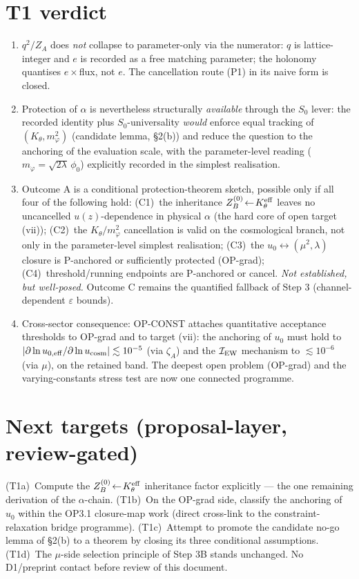 \documentclass[11pt,a4paper]{article}
\begin{document}
\section{T1 verdict}
\begin{enumerate}[leftmargin=1.9em,itemsep=2pt,label=\textbf{V\arabic*.}]
\item $q^2/Z_A$ does \emph{not} collapse to parameter-only via the numerator: $q$
is lattice-integer and $e$ is recorded as a free matching parameter; the holonomy
quantises $e\times$flux, not $e$. The cancellation route (P1) in its naive form is
closed.
\item Protection of $\alpha$ is nevertheless structurally \emph{available} through
the $S_0$ lever: the recorded identity plus $S_0$-universality \emph{would}
enforce equal tracking of $(K_\theta,m_\varphi^2)$ (candidate lemma, \S2(b)) and
reduce the question to the anchoring of
the evaluation scale, with the parameter-level reading
($m_\varphi=\sqrt{2\lambda}\,\phi_0$) explicitly recorded in the simplest
realisation.
\item Outcome A is a conditional protection-theorem sketch, possible only if all
four of the following hold: (C1)~the inheritance
$Z_B^{(0)}\!\leftarrow\!K_\theta^{\rm eff}$ leaves no uncancelled
$u(z)$-dependence in physical $\alpha$ (the hard core of open target (vii));
(C2)~the $K_\theta/m_\varphi^2$ cancellation is valid on the cosmological branch,
not only in the parameter-level simplest realisation; (C3)~the
$u_0\!\leftrightarrow\!(\mu^2,\lambda)$ closure is P-anchored or sufficiently
protected (OP-grad); (C4)~threshold/running endpoints are P-anchored or cancel.
\emph{Not established, but well-posed.} Outcome C remains the quantified fallback
of Step 3 (channel-dependent $\varepsilon$ bounds).
\item Cross-sector consequence: OP-CONST attaches quantitative acceptance
thresholds to OP-grad and to target (vii): the anchoring of $u_0$ must hold to
$|\partial\ln u_{0,{\rm eff}}/\partial\ln u_{\rm cosm}|\lesssim10^{-5}$ (via
$\zeta_A$) and the $\mathcal I_{\rm EW}$ mechanism to $\lesssim10^{-6}$ (via
$\mu$), on the retained band. The deepest open problem (OP-grad) and the
varying-constants stress test are now one connected programme.
\end{enumerate}

\section{Next targets (proposal-layer, review-gated)}
(T1a)~Compute the $Z_B^{(0)}\!\leftarrow\!K_\theta^{\rm eff}$ inheritance factor
explicitly --- the one remaining derivation of the $\alpha$-chain. (T1b)~On the
OP-grad side, classify the anchoring of $u_0$ within the OP3.1 closure-map work
(direct cross-link to the constraint-relaxation bridge programme).
(T1c)~Attempt to promote the candidate no-go lemma of \S2(b) to a theorem by
closing its three conditional assumptions. (T1d)~The $\mu$-side selection
principle of Step 3B
stands unchanged. No D1/preprint contact before review of this document.
\end{document}
